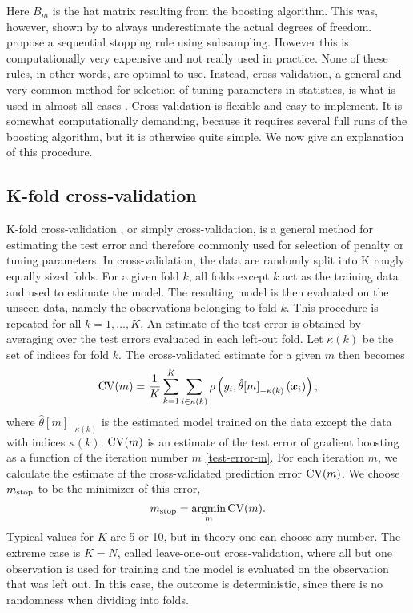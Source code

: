 Here $B_m$ is the hat matrix resulting from the boosting algorithm.
This was, however, shown by \citet{hastie2007} to always underestimate the actual degrees of freedom.
\citet{mayr-hofner} propose a sequential stopping rule using subsampling.
However this is computationally very expensive and not really used in practice.
None of these rules, in other words, are optimal to use.
Instead, cross-validation, a general and very common method for selection of tuning parameters in statistics, is what is used in almost all cases \citep{mayr14a,mayr14b,mayr17}.
Cross-validation is flexible and easy to implement.
It is somewhat computationally demanding, because it requires several full runs of the boosting algorithm, but it is otherwise quite simple.
We now give an explanation of this procedure.


\subsection{K-fold cross-validation}\label{subsec:K-fold}
K-fold cross-validation \citep{lachenbruch}, or simply cross-validation, is a general method for estimating the test error and therefore commonly used for selection of penalty or tuning parameters.
In cross-validation, the data are randomly split into K rougly equally sized folds.
For a given fold $k$, all folds except $k$ act as the training data and used to estimate the model.
The resulting model is then evaluated on the unseen data, namely the observations belonging to fold $k$.
This procedure is repeated for all $k=1,\ldots,K$.
An estimate of the test error is obtained by averaging over the test errors evaluated in each left-out fold.
Let $\kappa(k)$ be the set of indices for fold $k$.
The cross-validated estimate for a given $m$ then becomes
\begin{equation*}
    \operatorname{CV}(m)=\frac{1}{K}\sum_{k=1}^K\sum_{i\in\kappa(k)}\rho\left(y_i,\hat{\theta}{[m]}_{-\kappa(k)}\left(\bm{x}_i\right)\right),
\end{equation*}
where $\hat{\theta}{[m]}_{-\kappa(k)}$ is the estimated model trained on the data except the data with indices $\kappa(k)$.
$\operatorname{CV}(m)$ is an estimate of the test error of gradient boosting as a function of the iteration number $m$ \eqref{test-error-m}.
For each iteration $m$, we calculate the estimate of the cross-validated prediction error $\operatorname{CV}(m)$.
We choose $m_{\text{stop}}$ to be the minimizer of this error,
\begin{equation*}
    m_{\text{stop}}=\operatorname*{argmin}_{m}\operatorname{CV}(m).
\end{equation*}
Typical values for $K$ are 5 or 10, but in theory one can choose any number. The extreme case is $K=N$, called leave-one-out cross-validation, where all but one observation is used for training and the model is evaluated on the observation that was left out. In this case, the outcome is deterministic, since there is no randomness when dividing into folds.

